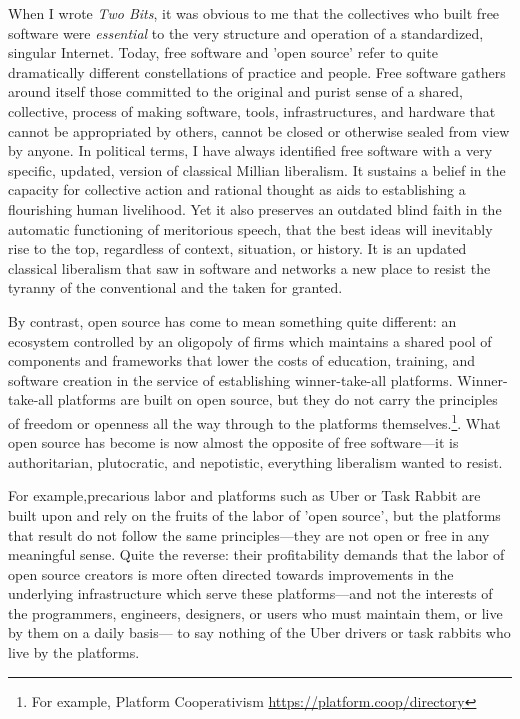 \documentclass[11pt]{report}
\begin{document}
When I wrote \emph{Two Bits}, it was obvious to me that the collectives who built free software were \emph{essential} to the very structure and operation of a standardized, singular Internet. Today, free software and 'open source' refer to quite dramatically different constellations of practice and people. Free software gathers around itself those committed to the original and purist sense of a shared, collective, process of making software, tools, infrastructures, and hardware that cannot be appropriated by others, cannot be closed or otherwise sealed from view by anyone.  In political terms, I have always identified free software with a very specific, updated, version of classical Millian liberalism.  It sustains a belief in the capacity for collective action and rational thought as aids to establishing a flourishing human livelihood.  Yet it also preserves an outdated blind faith in the automatic functioning of meritorious speech,  that the best ideas will inevitably rise to the top, regardless of context, situation, or history.  It is an updated classical liberalism that saw in software and networks a new place to resist the tyranny of the conventional and the taken for granted.  

By contrast, open source has come to mean something quite different: an ecosystem controlled by an oligopoly of firms which maintains a shared pool of components and frameworks that lower the costs of education, training, and software creation in the service of establishing winner-take-all platforms.  Winner-take-all platforms are built on open source, but they do not carry the principles of freedom or openness all the way through to the platforms themselves.\footnote{For example, Platform Cooperativism \url{https://platform.coop/directory}}.  What open source has become is now almost the opposite of free software---it is authoritarian, plutocratic, and nepotistic, everything liberalism wanted to resist.

For example,precarious labor and platforms such as Uber or Task Rabbit are built upon and rely on the fruits of the labor of 'open source', but the platforms that result do not follow the same principles---they are not open or free in any meaningful sense.  Quite the reverse: their profitability demands that the labor of open source creators is more often directed towards improvements in the underlying infrastructure which serve these platforms---and not the interests of the programmers, engineers, designers, or users who must maintain them, or live by them on a daily basis--- to say nothing of the Uber drivers or task rabbits who live by the platforms.  
\end{document}
